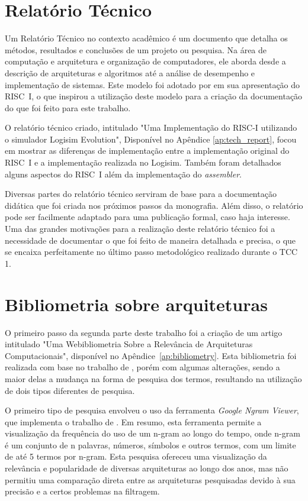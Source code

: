 \documentclass[
	12pt,				%
	openright,			%
	oneside,			%
	a4paper,			%
	english,			%
	french,				%
	spanish,			%
	brazil,				%
	]{abntex2}
\begin{document}
\section{Relatório Técnico}

Um Relatório Técnico no contexto acadêmico é um documento que detalha os métodos, resultados e conclusões de um projeto ou pesquisa. Na área de computação e arquitetura e organização de computadores, ele aborda desde a descrição de arquiteturas e algoritmos até a análise de desempenho e implementação de sistemas. Este modelo foi adotado por \cite{peek_vlsi_1983} em sua apresentação do RISC~I, o que inspirou a utilização deste modelo para a criação da documentação do que foi feito para este trabalho.

O relatório técnico criado, intitulado "Uma Implementação do RISC-I utilizando o simulador Logisim Evolution", Disponível no Apêndice \ref{ap:tech_report}, focou em mostrar as diferenças de implementação entre a implementação original do RISC~I e a implementação realizada no Logisim. Também foram detalhados alguns aspectos do RISC~I além da implementação do \textit{assembler}.

Diversas partes do relatório técnico serviram de base para a documentação didática que foi criada nos próximos passos da monografia. Além disso, o relatório pode ser facilmente adaptado para uma publicação formal, caso haja interesse. Uma das grandes motivações para a realização deste relatório técnico foi a necessidade de documentar o que foi feito de maneira detalhada e precisa, o que se encaixa perfeitamente no último passo metodológico realizado durante o TCC 1.

\section{Bibliometria sobre arquiteturas}\label{bibliometry}

O primeiro passo da segunda parte deste trabalho foi a criação de um artigo intitulado "Uma Webibliometria Sobre a Relevância de Arquiteturas Computacionais", disponível no Apêndice~\ref{ap:bibliometry}. Esta bibliometria foi realizada com base no trabalho de , porém com algumas alterações, sendo a maior delas a mudança na forma de pesquisa dos termos, resultando na utilização de dois tipos diferentes de pesquisa.

O primeiro tipo de pesquisa envolveu o uso da ferramenta \textit{Google Ngram Viewer}, que implementa o trabalho de . Em resumo, esta ferramenta permite a visualização da frequência do uso de um n-gram ao longo do tempo, onde n-gram é um conjunto de n palavras, números, símbolos e outros termos, com um limite de até 5 termos por n-gram. Esta pesquisa ofereceu uma visualização da relevância e popularidade de diversas arquiteturas ao longo dos anos, mas não permitiu uma comparação direta entre as arquiteturas pesquisadas devido à sua precisão e a certos problemas na filtragem.
\end{document}
